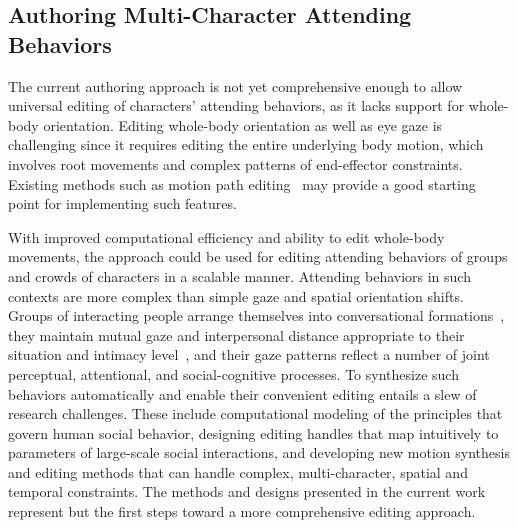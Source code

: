 \subsection{Authoring Multi-Character Attending Behaviors}

The current authoring approach is not yet comprehensive enough to allow universal editing of characters' attending behaviors, as it lacks support for whole-body orientation. Editing whole-body orientation as well as eye gaze is challenging since it requires editing the entire underlying body motion, which involves root movements and complex patterns of end-effector constraints. Existing methods such as motion path editing~\citep{gleicher2001path} may provide a good starting point for implementing such features.

With improved computational efficiency and ability to edit whole-body movements, the approach could be used for editing attending behaviors of groups and crowds of characters in a scalable manner. Attending behaviors in such contexts are more complex than simple gaze and spatial orientation shifts. Groups of interacting people arrange themselves into conversational formations~\citep{kendon2010spacing}, they maintain mutual gaze and interpersonal distance appropriate to their situation and intimacy level~\citep{argyle1965eyecontact}, and their gaze patterns reflect a number of joint perceptual, attentional, and social-cognitive processes. To synthesize such behaviors automatically and enable their convenient editing entails a slew of research challenges. These include computational modeling of the principles that govern human social behavior, designing editing handles that map intuitively to parameters of large-scale social interactions, and developing new motion synthesis and editing methods that can handle complex, multi-character, spatial and temporal constraints. The methods and designs presented in the current work represent but the first steps toward a more comprehensive editing approach. 